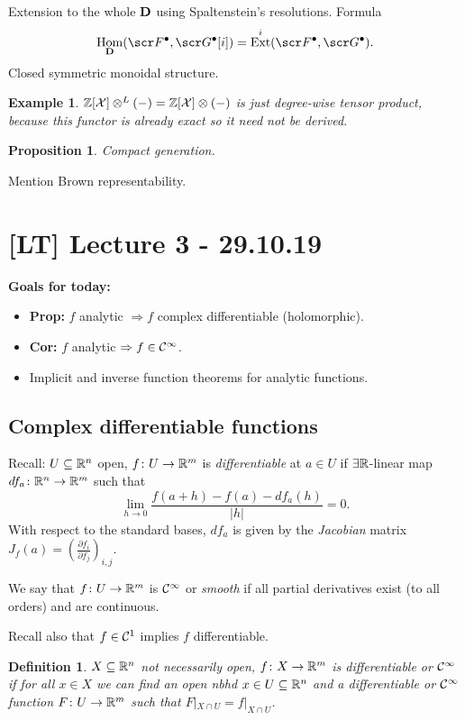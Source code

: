 \documentclass[A4paper, british, reqno]{amsart}
\theoremstyle{darkgreentheorem}
\newtheorem{prop}[thm]{Proposition}
\theoremstyle{darkbluedefinition}
\newtheorem{defn}[thm]{Definition}
\theoremstyle{darkredexample}
\newtheorem{exa}[thm]{Example}
\theoremstyle{remark}
\DeclareMathOperator{\Hom}{Hom}
\DeclareMathOperator{\Ext}{Ext}
\newcommand{\1}{\mathbbm{1}}
\newcommand{\ot}{\otimes}
\newcommand{\grd}{^{\bullet}}
\begin{document}
Extension to the whole $\mathbf{D}$ using Spaltenstein's resolutions.
Formula
\[ \Hom_{\D}(\F\grd,\G\grd[i])=\Ext^{i}(\F\grd,\G\grd).\]
Closed symmetric monoidal structure.

\begin{exa}
    $\Z[\X]\ot^{L}(-)=\Z[\X]\ot(-)$ is just degree-wise tensor product, because this functor is already exact so it need not be derived.
\end{exa}

\begin{prop}
    Compact generation.
\end{prop}

Mention Brown representability.

\section{[LT] Lecture 3 - 29.10.19}

\textbf{Goals for today:}
\begin{itemize}
    \item \textbf{Prop:} $f$ analytic $\Rightarrow f$ complex differentiable (holomorphic).
    \item \textbf{Cor:} $f$ analytic $\Rightarrow f\in \mathcal{C}^{\infty}$.
    \item Implicit and inverse function theorems for analytic functions.
\end{itemize}

\subsection{Complex differentiable functions}

Recall: $U\subseteq \mathbb{R}^{n}$ open, $f\colon U\to \mathbb{R}^{m}$ is \textit{differentiable} at $a\in U$ if $\exists \mathbb{R}$-linear map $df_{a}\colon \mathbb{R}^{n}\to \mathbb{R}^{m}$ such that
\[ \lim_{h\to 0}\frac{f(a+h)-f(a)-df_{a}(h)}{|h|}=0.\]
With respect to the standard bases, $df_{a}$ is given by the \textit{Jacobian} matrix $J_{f}(a)=(\frac{\partial f_{i}}{\partial f_{j}})_{i,j}$.

We say that $f\colon U\to \mathbb{R}^{m}$ is $\mathcal{C}^{\infty}$ or \textit{smooth} if all partial derivatives exist (to all orders) and are continuous.

Recall also that $f\in \mathcal{C}^{1}$ implies $f$ differentiable.

\begin{defn}
    $X\subseteq \mathbb{R}^{n}$ not necessarily open, $f\colon X\to \mathbb{R}^{m}$ is \textit{differentiable} or $\mathcal{C}^{\infty}$ if for all $x\in X$ we can find an open nbhd $x\in U\subseteq \mathbb{R}^{n}$ and a differentiable or $\mathcal{C}^{\infty}$ function $F\colon U\to \mathbb{R}^{m}$ such that $F|_{X\cap U}=f|_{X\cap U}$.
\end{defn}
\end{document}
